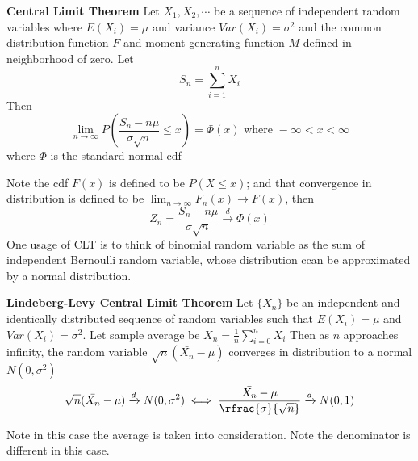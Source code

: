 \documentclass[11pt]{article}
\begin{document}
\begin{theorem*}
  \textbf{Central Limit Theorem} Let $X_1, X_2, \cdots $ be a sequence of independent random variables where $E(X_i) = \mu$ and variance $Var(X_i) = \sigma^2$ and the common distribution function $F$ and moment generating function $M$ defined in neighborhood of zero. Let
  \[
    S_n = \sum_{i=1}^{n} X_i
  \]
  Then
  \[
    \lim_{n \to \infty} P ( \frac{S_n - n\mu}{\sigma  \sqrt{n} } \leq x ) = \Phi(x) \text{ where }  -\infty < x < \infty
  \]
  where $\Phi$ is the standard normal cdf\\
  \begin{rem}
    Note the cdf $F(x)$ is defined to be $P(X\leq x)$; and that convergence in distribution is defined to be $\lim_{n\to\infty} F_n(x) \to F(x)$, then
    \[
      Z_n = \frac{S_n - n\mu}{\sigma  \sqrt{n} }\xrightarrow{d} \Phi(x)
    \]
    One usage of CLT is to think of binomial random variable as the sum of independent Bernoulli random variable, whose distribution ccan be approximated by a normal distribution.
  \end{rem}

\end{theorem*}

\begin{theorem*}
  \textbf{Lindeberg-Levy Central Limit Theorem} Let $\{ X_n\}$ be an independent and identically distributed sequence of random variables such that $E(X_i) = \mu$ and $Var(X_i)=\sigma^2$. Let sample average be $\bar{X_n} =\frac{1}{n}\sum_{i=0}^{n} X_i$ Then as $n$ approaches infinity, the random variable $\sqrt{n}(\bar{X_n} - \mu)$ converges in distribution to a normal $N(0, \sigma^2)$
  \[
    \sqrt{n}(\bar{X_n} - \mu) \xrightarrow{d} N(0, \sigma^2) \iff \frac{\bar{X_n} - \mu}{\rfrac{\sigma}{\sqrt{n}}} \xrightarrow{d} N(0, 1)
  \]
  \begin{rem}
    Note in this case the average is taken into consideration. Note the denominator is different in this case.
  \end{rem}
\end{theorem*}
\end{document}
